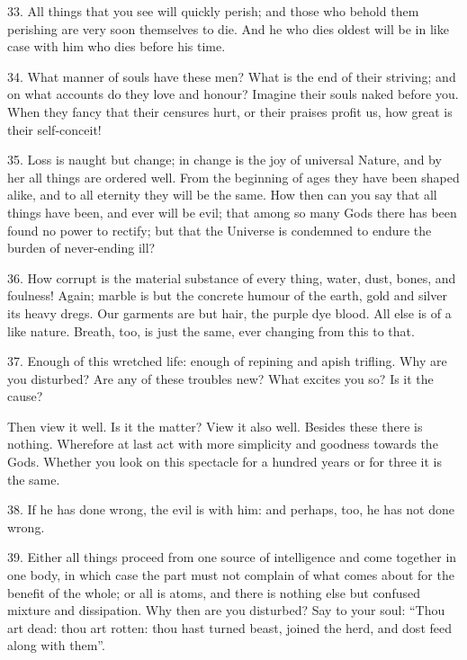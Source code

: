 \documentclass{book}
\begin{document}
33. All things that you see will quickly perish; and those who behold
them perishing are very soon themselves to die. And he who dies oldest
will be in like case with him who dies before his time.

34. What manner of souls have these men? What is the end of their
striving; and on what accounts do they love and honour? Imagine their
souls naked before you. When they fancy that their censures hurt, or
their praises profit us, how great is their self-conceit!

35. Loss is naught but change; in change is the joy of universal
Nature, and by her all things are ordered well. From the beginning of
ages they have been shaped alike, and to all eternity they will be the
same. How then can you say that all things have been, and ever will be
evil; that among so many Gods there has been found no power to
rectify; but that the Universe is condemned to endure the burden of
never-ending ill?

36. How corrupt is the material substance of every thing, water, dust,
bones, and foulness! Again; marble is but the concrete humour of the
earth, gold and silver its heavy dregs. Our garments are but hair, the
purple dye blood. All else is of a like nature. Breath, too, is just
the same, ever changing from this to that.

37. Enough of this wretched life: enough of repining and apish
trifling. Why are you disturbed? Are any of these troubles new? What
excites you so? Is it the cause?

Then view it well. Is it the matter? View it also well. Besides these
there is nothing. Wherefore at last act with more simplicity and
goodness towards the Gods. Whether you look on this spectacle for a
hundred years or for three it is the same.

38. If he has done wrong, the evil is with him: and perhaps, too, he
has not done wrong.

39. Either all things proceed from one source of intelligence and come
together in one body, in which case the part must not complain of what
comes about for the benefit of the whole; or all is atoms, and there
is nothing else but confused mixture and dissipation. Why then are you
disturbed? Say to your soul: ``Thou art dead: thou art rotten: thou
hast turned beast, joined the herd, and dost feed along with them''.
\end{document}
